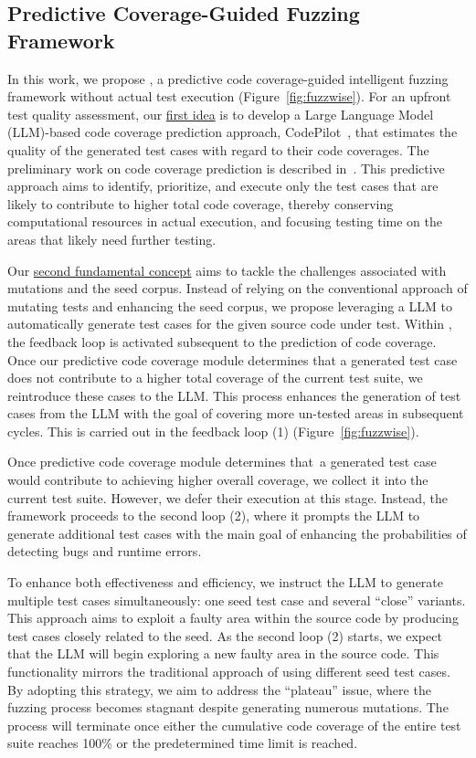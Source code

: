 \subsection{Predictive Coverage-Guided Fuzzing Framework}

In this work, we propose {\tool}, a predictive code coverage-guided
intelligent fuzzing framework without actual test execution
(Figure~\ref{fig:fuzzwise}). For an upfront test quality assessment,
our \underline{first idea} is to develop a Large Language Model (LLM)-based code
coverage prediction approach, CodePilot~\cite{forge24}, that estimates
the quality of the generated test cases with regard to their code
coverages. The preliminary work on code coverage prediction is
described in~\cite{forge24}. This predictive approach aims to
identify, prioritize, and execute only the test cases that are likely
to contribute to higher total code coverage, thereby conserving
computational resources in actual execution, and focusing testing time
on the areas that likely need further testing.

Our \underline{second fundamental concept} aims to tackle the challenges
associated with mutations and the seed corpus. Instead of relying on
the conventional approach of mutating tests and enhancing the seed
corpus, we propose leveraging a LLM to automatically generate test
cases for the given source code under test. Within {\tool}, the
feedback loop is activated subsequent to the prediction of code
coverage. Once our predictive code coverage module determines that a
generated test case does not contribute to a higher total coverage of
the current test suite, we reintroduce these cases to the LLM.
This process enhances the generation of test cases from the LLM with
the goal of covering more un-tested areas in subsequent cycles. This
is carried out in the feedback loop (1) (Figure~\ref{fig:fuzzwise}).

Once predictive code coverage module determines that~a generated
test case would contribute to achieving higher overall coverage, we
collect it into the current test suite. However, we defer their
execution at this stage. Instead, the framework proceeds to the second
loop (2), where it prompts the LLM to generate additional test cases
with the main goal of enhancing the probabilities of detecting bugs and
runtime errors.

To enhance both effectiveness and efficiency, we instruct the LLM to
generate multiple test cases simultaneously: one seed test case and
several ``close'' variants. This approach aims to exploit a
faulty area within the source code by producing test cases closely
related to the seed. As the second loop (2) starts, we
expect that the LLM will begin exploring a new faulty area in the
source code. This functionality mirrors the traditional approach of
using different seed test cases. By adopting this strategy, we aim to
address the ``plateau'' issue, where the fuzzing process becomes
stagnant despite generating numerous mutations. The process will
terminate once either the cumulative code coverage of the entire test
suite reaches 100\% or the predetermined time limit is reached.


